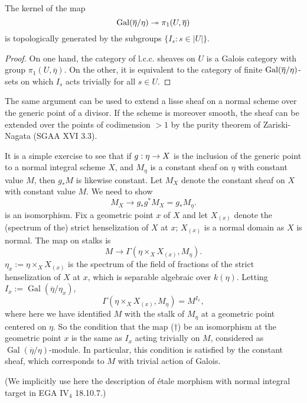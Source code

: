 \documentclass[deligne.tex]{subfiles}
\begin{document}
\begin{corollary*}
	The kernel of the map
	\begin{equation*}
		\operatorname{Gal}(\overline\eta/\eta)\twoheadrightarrow\pi_1(U,\overline\eta)
	\end{equation*}
	is topologically generated by the subgroups $\{I_s:s\in|U|\}$.
\end{corollary*}
\begin{proof}
	On one hand, the category of l.c.c. sheaves on $U$ is a Galois category
	with group $\pi_1(U,\overline\eta)$. On the other, it is equivalent to
	the category of finite $\operatorname{Gal}(\overline\eta/\eta)$-sets on which
	$I_s$ acts trivially for all $s\in U$.
\end{proof}
\begin{remark}
	The same argument can be used to extend a lisse sheaf on a normal scheme
	over the generic point of a divisor. If the scheme is moreover smooth,
	the sheaf can be extended over the points of codimension $>1$ by the
	purity theorem of Zariski-Nagata (SGAA XVI 3.3).
\end{remark}
\begin{remark}
It is a simple exercise to see that if $g:\eta\rightarrow X$ is the inclusion
of the generic point to a normal integral scheme $X$, and $M_\eta$
is a constant sheaf on $\eta$ with constant value $M$, then
$g_*M$ is likewise constant. Let $M_X$ denote the constant 
sheaf on $X$ with constant value $M$. We need to show
\begin{equation*}
	M_X\rightarrow g_*g^*M_X=g_*M_\eta\tag{$\dagger$}.
\end{equation*}
is an isomorphism. Fix a geometric point $x$ of $X$ and let $X_{(x)}$ denote the (spectrum of the) strict henselization of $X$ at $x$; $X_{(x)}$ is a normal domain as $X$ is normal. The map on stalks is
\begin{equation*}
	M\rightarrow\Gamma(\eta\times_X X_{(x)},M_\eta).
\end{equation*}
$\eta_x:=\eta\times_X X_{(x)}$ is the spectrum of the field of fractions of 
the strict henselization of $X$ at $x$, which is separable algebraic over
$k(\eta)$.
Letting $I_x:=\operatorname{Gal}(\overline\eta/\eta_x)$,
\begin{equation*}
	\Gamma(\eta\times_X X_{(x)},M_\eta)=M^{I_x},
\end{equation*}
where here we have identified $M$ with the stalk of $M_\eta$ at a geometric point centered on $\eta$. So the condition that the map ($\dagger$) be an isomorphism at the geometric point $x$ is the same as $I_x$ acting trivially on $M$, considered as $\operatorname{Gal}(\overline\eta/\eta)$-module. In particular, this condition is satisfied by the constant sheaf, which corresponds to $M$ with trivial action of Galois.

(We implicitly use here the description of étale morphism with normal integral target in EGA $\text{IV}_4$ 18.10.7.)
\end{remark}
\end{document}
